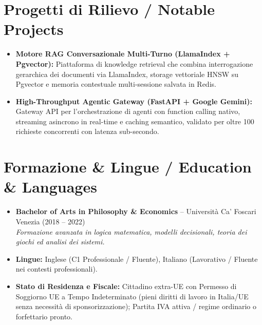 \documentclass[a4paper,10pt]{article}
\begin{document}
\section{Progetti di Rilievo / Notable Projects}
\begin{itemize}
  \item \textbf{Motore RAG Conversazionale Multi-Turno (LlamaIndex + Pgvector):} Piattaforma di knowledge retrieval che combina interrogazione gerarchica dei documenti via LlamaIndex, storage vettoriale HNSW su Pgvector e memoria contestuale multi-sessione salvata in Redis.
  \item \textbf{High-Throughput Agentic Gateway (FastAPI + Google Gemini):} Gateway API per l'orchestrazione di agenti con function calling nativo, streaming asincrono in real-time e caching semantico, validato per oltre 100 richieste concorrenti con latenza sub-secondo.
\end{itemize}

\section{Formazione \& Lingue / Education \& Languages}
\begin{itemize}
  \item \textbf{Bachelor of Arts in Philosophy \& Economics} -- Università Ca' Foscari Venezia (2018 -- 2022) \\
  \textit{Formazione avanzata in logica matematica, modelli decisionali, teoria dei giochi ed analisi dei sistemi.}
  \item \textbf{Lingue:} Inglese (C1 Professionale / Fluente), Italiano (Lavorativo / Fluente nei contesti professionali).
  \item \textbf{Stato di Residenza e Fiscale:} Cittadino extra-UE con Permesso di Soggiorno UE a Tempo Indeterminato (pieni diritti di lavoro in Italia/UE senza necessità di sponsorizzazione); Partita IVA attiva / regime ordinario o forfettario pronto.
\end{itemize}
\end{document}
